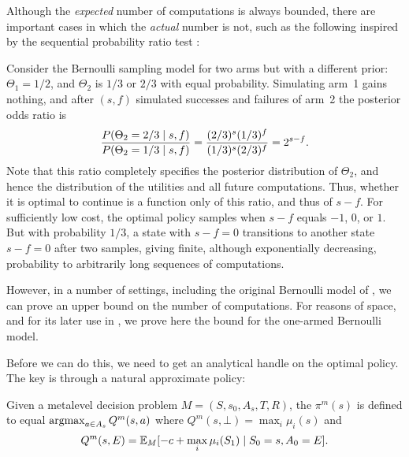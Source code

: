 Although the \emph{expected} number of computations is always bounded,
there are important cases in which the \emph{actual} number is not, such as
the following inspired by the sequential probability ratio test \citep{Wald+1945}:

\begin{example}\label{example:sprt}
Consider the Bernoulli sampling model for two arms but with a different prior:
	$\Theta_1=1/2$,
	and $\Theta_2$ is $1/3$ or $2/3$ with equal probability.
%
Simulating arm~1 gains nothing, and after $(s,f)$ simulated successes and failures of arm~2
the posterior odds ratio is
\[
	\frac{P(\Theta_2=2/3\mid s,f)}{P(\Theta_2=1/3\mid s,f)} = \frac{(2/3)^s(1/3)^f}{(1/3)^s(2/3)^f}= 2^{s-f}.
\]
Note that this ratio completely specifies the posterior distribution of $\Theta_2$,
and hence the distribution of the utilities and all future computations.  Thus, whether
it is optimal to continue is a function only of this ratio, and thus of $s-f$.
For sufficiently low cost, the 
optimal policy samples when $s-f$ equals $-1$, $0$, or $1$.  But with probability
$1/3$, a state with $s-f=0$ transitions to another state $s-f=0$ after two samples, 
giving finite, although exponentially decreasing, probability to arbitrarily long 
sequences of computations.
\end{example}


However, in a number of settings, including the original Bernoulli model of ,
we can prove an upper bound on the number of computations.  For reasons of space,
and for its later use in , we prove here the bound for the one-armed Bernoulli model.

Before we can do this, we need to get an analytical handle on the optimal policy.
The key is through a natural approximate policy:

\begin{dfn}\label{dfn:myopic}
	Given a metalevel decision problem $M=(S,s_0,A_s,T,R)$,
	the  $\pi^m(s)$ is defined to equal $\operatorname*{argmax}_{a\in A_s} Q^m(s,a)$ 
	where $Q^m(s,\bot) = \max_i \mu_i(s)$ and
	\begin{equation*}%
		 Q^m(s,E) = \IE_M[ -c + \max_i \mu_i(S_1) \given S_0 = s, A_0 = E].		
	\end{equation*}
\end{dfn}

